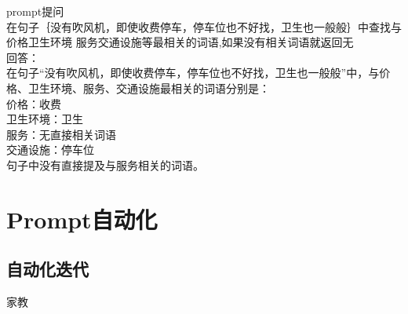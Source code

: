 \documentclass[12pt]{book}
\begin{document}
prompt提问\\
在句子｛没有吹风机，即使收费停车，停车位也不好找，卫生也一般般｝中查找与价格卫生环境 服务交通设施等最相关的词语,如果没有相关词语就返回无\\


回答：\\
在句子“没有吹风机，即使收费停车，停车位也不好找，卫生也一般般”中，与价格、卫生环境、服务、交通设施最相关的词语分别是：\\

价格：收费\\
卫生环境：卫生\\
服务：无直接相关词语\\
交通设施：停车位\\
句子中没有直接提及与服务相关的词语。\\

\chapter{Prompt自动化}
\section{自动化迭代}


\bigskip
家教
\end{document}
